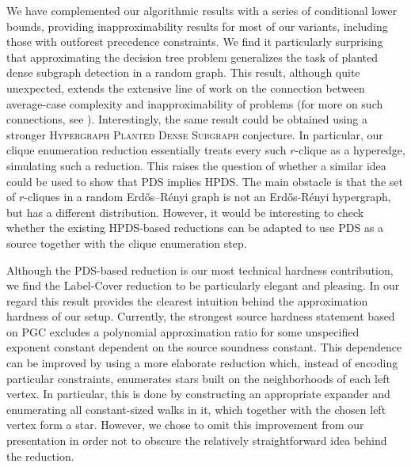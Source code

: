 We have complemented our algorithmic results with a series of conditional lower bounds, providing inapproximability results for most of our variants, including those with outforest precedence constraints. We find it particularly surprising that approximating the decision tree problem generalizes the task of planted dense subgraph detection in a random graph. This result, although quite unexpected, extends the extensive line of work on the connection between average-case complexity and inapproximability of problems (for more on such connections, see \cite{Feige2002RelationsBetweenAverageCaseComplexityAndApproximationComplexity}).
Interestingly, the same result could be obtained using a stronger \textup{\textsc{Hypergraph Planted Dense Subgraph}} conjecture. In particular, our clique enumeration reduction essentially treats every such $r$-clique as a hyperedge, simulating such a reduction. This raises the question of whether a similar idea could be used to show that PDS implies HPDS. The main obstacle is that the set of $r$-cliques in a random Erd\H{o}s--R\'enyi graph is not an Erd\H{o}s-R\'enyi hypergraph, but has a different distribution. However, it would be interesting to check whether the existing HPDS-based reductions can be adapted to use PDS as a source together with the clique enumeration step.

Although the PDS-based reduction is our most technical hardness contribution, we find the Label-Cover reduction to be particularly elegant and pleasing. In our regard this result provides the clearest intuition behind the approximation hardness of our setup. Currently, the strongest source hardness statement based on PGC excludes a polynomial approximation ratio for some unspecified exponent constant dependent on the source soundness constant. This dependence can be improved by using a more elaborate reduction which, instead of encoding particular constraints, enumerates stars built on the neighborhoods of each left vertex. In particular, this is done by constructing an appropriate expander and enumerating all constant-sized walks in it, which together with the chosen left vertex form a star. However, we chose to omit this improvement from our presentation in order not to obscure the relatively straightforward idea behind the reduction. 

